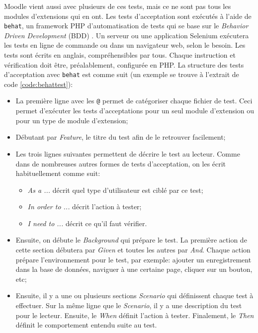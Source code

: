 Moodle vient aussi avec plusieurs de ces tests, mais ce ne sont pas tous les modules d'extensions qui en ont.
%
Les tests d'acceptation sont ex\'ecut\'es \`a l'aide de \texttt{behat}, un \og framework \fg{} PHP d'automatisation de tests qui se base sur le \og \textit{Behavior Driven Development} (BDD) \fg{}. 
Un serveur ou une application Selenium ex\'ecutera les tests en ligne de commande ou dans un navigateur web, selon le besoin.
Les tests sont \'ecrits en anglais, compr\'ehensibles par tous.
Chaque instruction et v\'erification doit \^etre, pr\'ealablement, configur\'ee en PHP.
La structure des tests d'acceptation avec \texttt{behat} est comme suit (un exemple se trouve \`a l'extrait de code \ref{code:behattest}):
\begin{itemize}
  \item La premi\`ere ligne avec les \verb|@| permet de cat\'egoriser chaque fichier de test.
        Ceci permet d'ex\'ecuter les tests d'acceptations pour un seul module d'extension ou pour un type de module d'extension;
        
  \item D\'ebutant par \textit{Feature}, le titre du test afin de le retrouver facilement;
  
  \item Les trois lignes suivantes permettent de d\'ecrire le test au lecteur.
        Comme dans de nombreuses autres formes de tests d'acceptation, on les \'ecrit habituellement comme suit:
        
        \begin{itemize}
          \item \og \textit{As a ...} \fg{} d\'ecrit quel type d'utilisateur est cibl\'e par ce test;
          \item \og \textit{In order to ...} \fg{} d\'ecrit l'action \`a tester;
          \item \og \textit{I need to ...} \fg{} d\'ecrit ce qu'il faut v\'erifier.
        \end{itemize}
        
  \item Ensuite, on d\'ebute le \textit{Background} qui pr\'epare le test.
        La premi\`ere action de cette section d\'ebutera par \textit{Given} et toutes les autres par \textit{And}.
        Chaque action pr\'epare l'environnement pour le test, par exemple: ajouter un enregistrement dans la base de donn\'ees, naviguer \`a une certaine page, cliquer sur un bouton, etc;
        
  \item Ensuite, il y a une ou plusieurs sections \textit{Scenario} qui d\'efinissent chaque test \`a effectuer.
        Sur la m\^eme ligne que le \textit{Scenario}, il y a une description du test pour le lecteur.
        Ensuite, le \textit{When} d\'efinit l'action \`a tester.
        Finalement, le \textit{Then} d\'efinit le comportement entendu suite au test.
\end{itemize}

